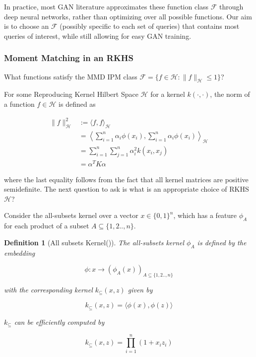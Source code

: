 \documentclass[]{article}
\newcommand{\F}{\mathcal{F}}
\newcommand{\B}{\{0,1\}}
\newtheorem{definition}{Definition}[section]
\theoremstyle{definition}
\begin{document}
In practice, most GAN literature approximates these function class $\mathcal{F}$ through deep neural networks, rather than optimizing over all possible functions. Our aim is to choose an $\F$ (possibly specific to each set of queries) that contains most queries of interest, while still allowing for easy GAN training. 

\subsubsection{Moment Matching in an RKHS}

What functions satisfy the MMD IPM class  $\F = \{f \in \mathcal{H}: \|f\|_\mathcal{H} \leq 1 \}$? 

For some Reproducing Kernel Hilbert Space $\mathcal{H}$ for a kernel $k(\cdot,\cdot)$, the norm of a function $f \in \mathcal{H}$ is defined as 

\begin{align*}
    \| f \|^2_\mathcal{H} &:= \langle f, f \rangle _\mathcal{H}  \\
    &= \left \langle \sum_{i=1}^n \alpha_i \phi(x_i) , \sum_{i=1}^n \alpha_i \phi(x_i)   \right\rangle  _\mathcal{H} \\
    &= \sum_{i=1}^n \sum_{j=1}^n \alpha_i^2 k(x_i, x_j) \\
    &= \alpha^TK\alpha
\end{align*}

where the last equality follows from the fact that all kernel matrices are positive semidefinite. The next question to ask is what is an appropriate choice of RKHS $\mathcal{H}$? 


Consider the all-subsets kernel over a vector $x \in \B^n$, which has a feature $\phi_A$ for each product of a subset $A \subseteq \{1,2..,n\}$. 

\begin{definition}[All subsets Kernel(\cite{SC})]
    The all-subsets kernel $\phi_A$ is defined by the embedding
    
    \begin{equation}
        \phi : x \to (\phi_A(x))_{A \subseteq \{1,2..,n\}}
    \end{equation}

    with the corresponding kernel $k_\subseteq(x,z)$ given by
    
    \begin{equation}
        k_\subseteq(x,z) = \langle \phi(x), \phi(z) \rangle 
    \end{equation}
    
    $k_\subseteq$ can be efficiently computed by

    \begin{equation}
        k_\subseteq(x,z) = \prod_{i=1}^n (1 + x_iz_i)
    \end{equation}
\end{definition}
\end{document}
